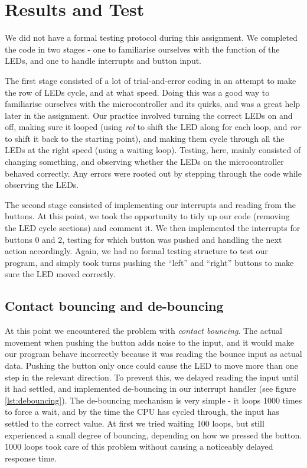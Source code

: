 \section{Results and Test}
We did not have a formal testing protocol during this assignment. We completed the code in two stages - one to familiarise ourselves with the function of the LEDs, and one to handle interrupts and button input. 

The first stage consisted of a lot of trial-and-error coding in an attempt to make the row of LEDs cycle, and at what speed. Doing this was a good way to familiarise ourselves with the microcontroller and its quirks, and was a great help later in the assignment. Our practice involved turning the correct LEDs on and off, making sure it looped (using {\em rol} to shift the LED along for each loop, and {\em ror} to shift it back to the starting point), and making them cycle through all the LEDs at the right speed (using a waiting loop). Testing, here, mainly consisted of changing something, and observing whether the LEDs on the microcontroller behaved correctly. Any errors were rooted out by stepping through the code while observing the LEDs.

The second stage consisted of implementing our interrupts and reading from the buttons. At this point, we took the opportunity to tidy up our code (removing the LED cycle sections) and comment it. We then implemented the interrupts for buttons 0 and 2, testing for which button was pushed and handling the next action accordingly. Again, we had no formal testing structure to test our program, and simply took turns pushing the ``left'' and ``right'' buttons to make sure the LED moved correctly. 

\subsection{Contact bouncing and de-bouncing}
At this point we encountered the problem with {\em contact bouncing}. The actual movement when pushing the button adds noise to the input, and it would make our program behave incorrectly because it was reading the bounce input as actual data. Pushing the button only once could cause the LED to move more than one step in the relevant direction. To prevent this, we delayed reading the input until it had settled, and implemented de-bouncing in our interrupt handler (see figure \ref{lst:debouncing}). The de-bouncing mechanism is very simple - it loops 1000 times to force a wait, and by the time the CPU has cycled through, the input has settled to the correct value. At first we tried waiting 100 loops, but still experienced a small degree of bouncing, depending on how we pressed the button. 1000 loops took care of this problem without causing a noticeably delayed response time.

